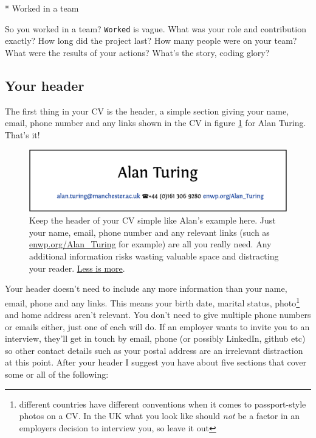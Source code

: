 \documentclass[
]{book}
\newenvironment{Shaded}{\begin{snugshade}}{\end{snugshade}}
\newcommand{\NormalTok}[1]{#1}
\newcommand{\SpecialStringTok}[1]{\textcolor[rgb]{0.31,0.60,0.02}{#1}}
\begin{document}
\begin{Shaded}
\begin{Highlighting}[]
\SpecialStringTok{* }\NormalTok{Worked in a team}
\end{Highlighting}
\end{Shaded}

So you worked in a team? \texttt{Worked} is vague. What was your role and contribution exactly? How long did the project last? How many people were on your team? What were the results of your actions? What's the story, coding glory? \citep{whatsthestory}

\hypertarget{mycvpd}{%
\subsection{Your header}\label{mycvpd}}

The first thing in your CV is the header, a simple section giving your name, email, phone number and any links shown in the CV in figure \ref{fig:turinghead-fig} for Alan Turing. That's it!

\begin{figure}

{\centering \includegraphics[width=0.98\linewidth]{images/alan-turing-header} 

}

\caption{Keep the header of your CV simple like Alan's example here. Just your name, email, phone number and any relevant links (such as \href{https://enwp.org/Alan_Turing}{enwp.org/Alan\_Turing} for example) are all you really need. Any additional information risks wasting valuable space and distracting your reader. \href{https://en.wikipedia.org/wiki/Less_(Unix)}{Less is more}.}\label{fig:turinghead-fig}
\end{figure}



Your header doesn't need to include any more information than your name, email, phone and any links. This means your birth date, marital status, photo\footnote{different countries have different conventions when it comes to passport-style photos on a CV. In the UK what you look like should \emph{not} be a factor in an employers decision to interview you, so leave it out} and home address aren't relevant. You don't need to give multiple phone numbers or emails either, just one of each will do. If an employer wants to invite you to an interview, they'll get in touch by email, phone (or possibly LinkedIn, github etc) so other contact details such as your postal address are an irrelevant distraction at this point. After your header I suggest you have about five sections that cover some or all of the following:
\end{document}
